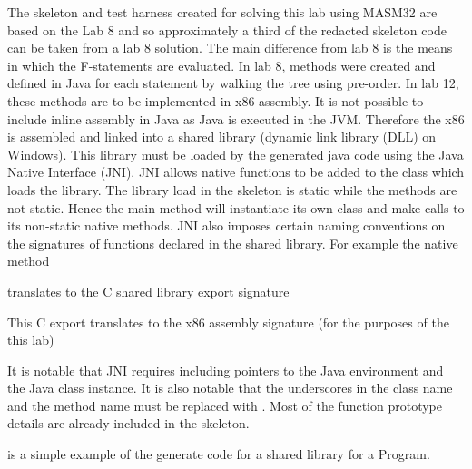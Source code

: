 %
The skeleton and test harness created for solving this lab using MASM32 are based on the Lab 8 and so approximately a third of the redacted skeleton code can be taken from a lab 8 solution. The main difference from lab 8 is the means in which the F-statements are evaluated. In lab 8, methods were created and defined in Java for each statement by walking the tree using pre-order. In lab 12, these methods are to be implemented in x86 assembly. It is not possible to include inline assembly in Java as Java is executed in the JVM. Therefore the x86 is assembled and linked into a shared library (dynamic link library (DLL) on Windows). This library must be loaded by the generated java code using the Java Native Interface (JNI). 
%
JNI allows native functions to be added to the class which loads the library. The library load in the skeleton is static while the methods are not static. Hence the main method will instantiate its own class and make calls to its non-static native methods. JNI also imposes certain naming conventions on the signatures of functions declared in the shared library. For example the native method 


\noindent
%
translates to the C shared library export signature 


\noindent
%
This C export translates to the x86 assembly signature (for the purposes of the this lab) 


\noindent
%
It is notable that JNI requires including pointers to the Java environment and the Java class instance. It is also notable that the underscores in the class name and the method name must be replaced with . Most of the function prototype details are already included in the skeleton.
%

 is a simple example of the generate code for a shared library for a \F Program.

